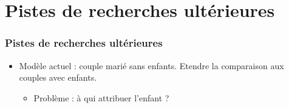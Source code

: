 \documentclass{beamer}
\begin{document}
\section{Pistes de recherches ultérieures}

\begin{frame}
\frametitle{Pistes de recherches ultérieures}

\begin{itemize}
\item Modèle actuel : couple marié sans enfants. Etendre la comparaison aux couples avec enfants. 

\begin{itemize}
\item Problème : à qui attribuer l'enfant ?
\end{itemize}


\end{itemize}

\end{frame}
\end{document}
